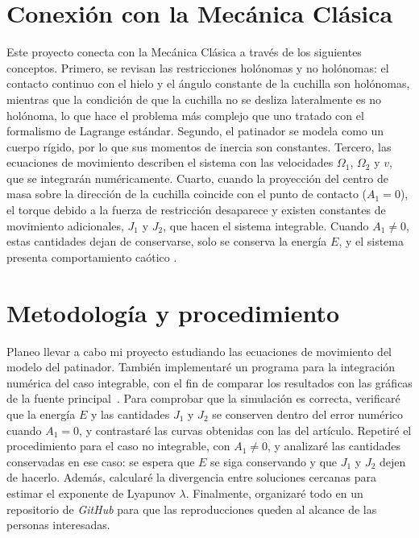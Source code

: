 \documentclass[12pt]{article}
\begin{document}
	\section*{Conexión con la Mecánica Clásica}
	Este proyecto conecta con la Mecánica Clásica a través de los siguientes conceptos.
	Primero, se revisan las restricciones holónomas y no holónomas: el contacto
	continuo con el hielo y el ángulo constante de la cuchilla son holónomas, mientras
	que la condición de que la cuchilla no se desliza lateralmente es no holónoma, lo
	que hace el problema más complejo que uno tratado con el formalismo de Lagrange
	estándar.
	Segundo, el patinador se modela como un cuerpo rígido, por lo que sus momentos de
	inercia son constantes.
	Tercero, las ecuaciones de movimiento describen el sistema con las velocidades $\Omega_1$, $\Omega_2$ y $v$,
	que se integrarán numéricamente.
	Cuarto, cuando la proyección del centro de masa sobre la dirección de la cuchilla
	coincide con el punto de contacto ($A_1 = 0$), el torque debido a la fuerza de
	restricción desaparece y existen constantes de movimiento adicionales, $J_1$ y
	$J_2$, que hacen el sistema integrable.
	Cuando $A_1 \neq 0$, estas cantidades dejan de conservarse, solo se conserva la
	energía $E$, y el sistema presenta comportamiento caótico \cite{gzenda2020}.
	
\section*{Metodología y procedimiento}

Planeo llevar a cabo mi proyecto estudiando las ecuaciones de movimiento del
modelo del patinador. También implementaré un programa para la integración
numérica del caso integrable, con el fin de comparar los resultados con las
gráficas de la fuente principal~\cite{gzenda2020}. Para comprobar que la
simulación es correcta, verificaré que la energía $E$ y las cantidades $J_1$ y
$J_2$ se conserven dentro del error numérico cuando $A_1 = 0$, y contrastaré
las curvas obtenidas con las del artículo. Repetiré el procedimiento para el
caso no integrable, con $A_1 \neq 0$, y analizaré las cantidades conservadas en
ese caso: se espera que $E$ se siga conservando y que $J_1$ y $J_2$ dejen de
hacerlo. Además, calcularé la divergencia entre soluciones cercanas para
estimar el exponente de Lyapunov $\lambda$. Finalmente, organizaré todo en un
repositorio de \textit{GitHub} para que las reproducciones queden al alcance
de las personas interesadas.
\end{document}
